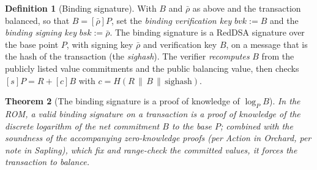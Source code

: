 \documentclass[11pt,a4paper]{article}
\newtheorem{theorem}{Theorem}[section]
\theoremstyle{definition}
\newtheorem{definition}[theorem]{Definition}
\theoremstyle{remark}
\begin{document}
\begin{definition}[Binding signature]\label{signatures:def:bindingsig}
With \(B\) and \(\bar\rho\) as above and the transaction balanced,
so that \(B = [\bar\rho]P\), set the \emph{binding verification key}
\(bvk := B\) and the \emph{binding signing key}
\(bsk := \bar\rho\). The binding signature is a RedDSA signature
over the base point \(P\), with signing key \(\bar\rho\) and
verification key \(B\), on a message that is the hash of the
transaction (the \emph{sighash}). The verifier \emph{recomputes}
\(B\) from the publicly listed value commitments and the public
balancing value, then checks
\([s]P = R + [c]B\) with \(c = H(R \,\|\, B \,\|\, \text{sighash})\).
\end{definition}

\begin{theorem}[The binding signature is a proof of knowledge of
\(\log_P B\)]\label{signatures:thm:bindingpok}
In the ROM, a valid binding signature on a transaction is a proof of
knowledge of the discrete logarithm of the net commitment \(B\) to
the base \(P\); combined with the soundness of the accompanying
zero-knowledge proofs (per Action in Orchard, per note in Sapling),
which fix \emph{and range-check} the committed values, it forces
the transaction to balance.
\end{theorem}
\end{document}
